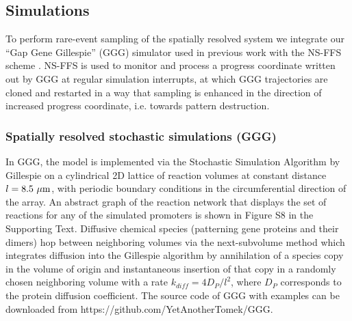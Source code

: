 \documentclass[a4paper,10pt]{article}
\newcommand{\unit}[1]{{\rm #1}}
\newcommand{\mum}{\unit{\mu m}}
\newcommand{\SI}{Supporting Text\xspace}
\newcommand{\myurl}[1]{\textsf{#1}} %
\begin{document}
\subsection*{Simulations}
To perform rare-event sampling of the spatially resolved system we integrate our
``Gap Gene Gillespie'' (GGG) simulator used in previous work \cite{Sokolowski2012, Erdmann2009} 
with the NS-FFS scheme \cite{BeckerAllenTenWolde2012}.
NS-FFS is used to monitor and process a progress coordinate written out by GGG at regular simulation interrupts,
at which GGG trajectories are cloned and restarted in a way that sampling is enhanced in the direction of increased 
progress coordinate, i.e. towards pattern destruction.  

\subsubsection*{Spatially resolved stochastic simulations (GGG)}
In GGG, the model is implemented via the Stochastic Simulation Algorithm by Gillespie \cite{Gillespie1976, Gillespie1977}
on a cylindrical 2D lattice of reaction volumes at constant distance $l=8.5~\unit{\mum}$, with periodic boundary
conditions in the circumferential direction of the array.   
An abstract graph of the reaction network that displays the set of reactions for any of the simulated promoters
is shown in Figure S8 in the \SI.
Diffusive chemical species (patterning gene proteins and their dimers) hop between neighboring volumes via the next-subvolume method 
\cite{Hattne2005} which integrates diffusion into the Gillespie algorithm by annihilation of a species copy in the volume of origin 
and instantaneous insertion of that copy in a randomly chosen neighboring volume with a rate $k_{diff}=4D_P/l^2$,
where $D_P$ corresponds to the protein diffusion coefficient.
The source code of GGG with examples can be downloaded from \myurl{https://github.com/YetAnotherTomek/GGG}.
\end{document}
